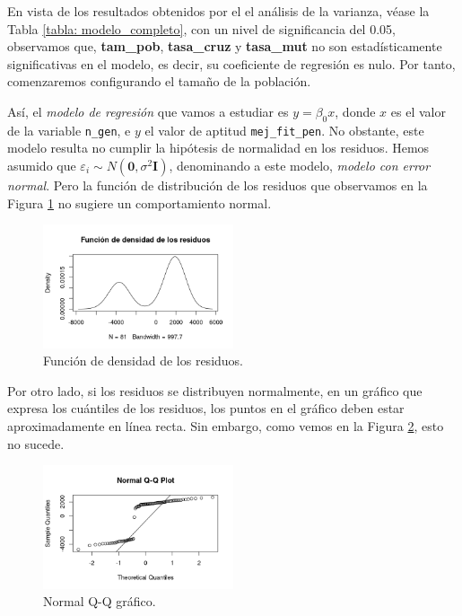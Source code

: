 \documentclass[12pt,a4paper]{book}
\begin{document}
En vista de los resultados obtenidos por el el análisis de la varianza, véase la Tabla \ref{tabla: modelo_completo}, con un nivel de significancia del 0.05, observamos que, {\bf tam\_pob}, {\bf tasa\_cruz} y {\bf tasa\_mut} no son estadísticamente significativas en el modelo, es decir, su coeficiente de regresión es nulo. Por tanto, comenzaremos configurando el tamaño de la población. 

Así, el \textsl{modelo de regresión} que vamos a estudiar es $y = \beta_0 x$, donde $x$ es el valor de la variable \texttt{n\_gen}, e $y$ el valor de aptitud \texttt{mej\_fit\_pen}. No obstante, este modelo resulta no cumplir la hipótesis de normalidad en los residuos. Hemos asumido que $\varepsilon_i \sim N(\textbf{0},\sigma^2\textbf{I})$, denominando a este modelo, \textsl{modelo con error normal}. Pero la función de distribución de los residuos que observamos en la Figura \ref{fig:DEN_RES} no sugiere un comportamiento normal. 

\begin{figure}[h]
 	\centering
  	\includegraphics[width=0.5\textwidth]{img/Densidad_residuos.png}
  	\caption{Función de densidad de los residuos.}
  	\label{fig:DEN_RES}
\end{figure}

Por otro lado, si los residuos se distribuyen normalmente, en un gráfico que expresa los cuántiles de los residuos, los puntos en el gráfico deben estar aproximadamente en línea recta. Sin embargo, como vemos en la Figura \ref{fig:QQ_RES}, esto no sucede.  

\begin{figure}[h]
 	\centering
  	\includegraphics[width=0.5\textwidth]{img/cuantiles_residuos.png}
  	\caption{Normal Q-Q gráfico.}
  	\label{fig:QQ_RES}
\end{figure}
\end{document}
